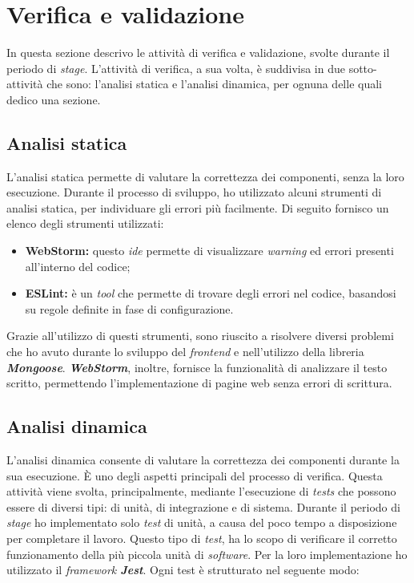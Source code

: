 \section{Verifica e validazione}
In questa sezione descrivo le attività di verifica e validazione, svolte durante il periodo di \emph{stage}.
L'attività di verifica, a sua volta, è suddivisa in due sotto-attività che sono: l'analisi statica e l'analisi dinamica, per ognuna delle quali dedico una sezione.

\subsection{Analisi statica}
L'analisi statica permette di valutare la correttezza dei componenti, senza la loro esecuzione.
Durante il processo di sviluppo, ho utilizzato alcuni strumenti di analisi statica, per individuare gli errori più facilmente. Di seguito fornisco un elenco degli strumenti utilizzati:
\begin{itemize}
  \item \textbf{\textbf{WebStorm}:} questo \emph{\acrshort{ide}} permette di visualizzare \emph{warning} ed errori presenti all'interno del codice;
  \item \textbf{\textbf{ESLint}:} è un \emph{tool} che permette di trovare degli errori nel codice, basandosi su regole definite in fase di configurazione.
\end{itemize}
Grazie all'utilizzo di questi strumenti, sono riuscito a risolvere diversi problemi che ho avuto durante lo sviluppo del \emph{\gls{frontend}} e nell'utilizzo della libreria \emph{\textbf{Mongoose}}.
\textbf{\emph{WebStorm}}, inoltre, fornisce la funzionalità di analizzare il testo scritto, permettendo l'implementazione di pagine web senza errori di scrittura.

\subsection{Analisi dinamica}
L'analisi dinamica consente di valutare la correttezza dei componenti durante la sua esecuzione. 
È uno degli aspetti principali del processo di verifica. 
Questa attività viene svolta, principalmente, mediante l'esecuzione di \emph{tests} che possono essere di diversi tipi: di unità, di integrazione e di sistema.
Durante il periodo di \emph{stage} ho implementato solo \emph{test} di unità, a causa del poco tempo a disposizione per completare il lavoro.
Questo tipo di \emph{test}, ha lo scopo di verificare il corretto funzionamento della più piccola unità di \emph{software}.
Per la loro implementazione ho utilizzato il \emph{framework \textbf{Jest}}. Ogni test è strutturato nel seguente modo:


